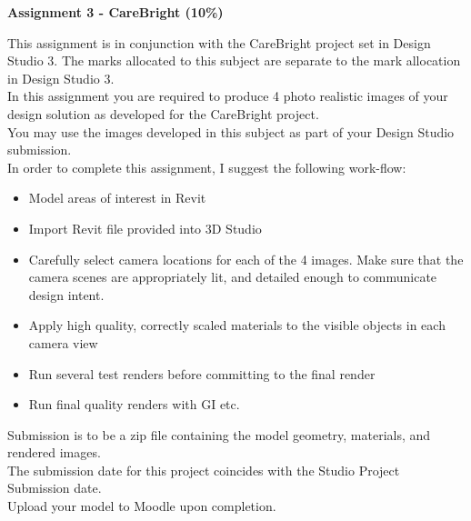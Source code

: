 
	
\begin{flushleft}
\Large\textbf{Assignment 3 - CareBright (10\%)}\\
\end{flushleft}

This assignment is in conjunction with the CareBright project set in Design Studio 3.  The marks allocated to this subject are separate to the mark allocation in Design Studio 3.\\

In this assignment you are required to produce 4 photo realistic images of your design solution as developed for the CareBright project.\\

You may use the images developed in this subject as part of your Design Studio submission.\\

In order to complete this assignment, I suggest the following work-flow:

\begin{itemize}
	\item Model areas of interest in Revit
	\item Import Revit file provided into 3D Studio
	\item Carefully select camera locations for each of the 4 images.  Make sure that the camera scenes are appropriately lit, and detailed enough to communicate design intent.  
	\item Apply high quality, correctly scaled materials to the visible objects in each camera view
	\item Run several test renders before committing to the final render
	\item Run final quality renders with GI etc.
\end{itemize}

Submission is to be a zip file containing the model geometry, materials, and rendered images.\\

The submission date for this project coincides with the Studio Project Submission date.\\

Upload your model to Moodle upon completion.


